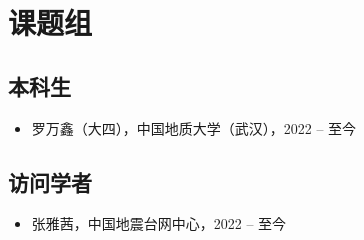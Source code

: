 \section{课题组}

\subsection{本科生}
\begin{itemize}
\item 罗万鑫（大四），中国地质大学（武汉），2022 -- 至今
\end{itemize}

\subsection{访问学者}
\begin{itemize}
\item 张雅茜，中国地震台网中心，2022 -- 至今
\end{itemize}
